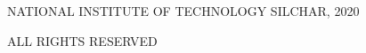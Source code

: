 \vspace*{\fill}
\begingroup
\centering
\textsuperscript{\textcopyright}NATIONAL INSTITUTE OF TECHNOLOGY SILCHAR, 2020

\hspace{6cm} ALL RIGHTS RESERVED
\hspace{6cm}
\endgroup
\vspace*{\fill}
